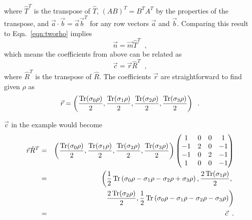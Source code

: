where $\hat{T}^T$ is the transpose of $\hat{T}$, $(AB)^T = B^TA^T$ by the properties of the transpose, and $\vec{a}\cdot\vec{b}=\vec{a}\vec{b}^T$ for any row vectors $\vec{a}$ and $\vec{b}$.  Comparing this result to Eqn.\ \ref{eqn:tworho} implies
$$
\vec{n} = \vec{m}\hat{T}^T\;\;,
$$
which means the coefficients from above can be related as
$$
\vec{c} = \vec{r}\hat{R}^T\;\;,
$$
where $\hat{R}^T$ is the transpose of $\hat{R}$.  The coefficients $\vec{r}$ are straightforward to find given $\rho$
as
$$
\vec{r} = \left(\frac{\operatorname{Tr}(\sigma_0 \rho)}{2},\frac{\operatorname{Tr}(\sigma_1 \rho)}{2},\frac{\operatorname{Tr}(\sigma_2 \rho)}{2},\frac{\operatorname{Tr}(\sigma_3 \rho)}{2}\right)\;\;.
$$
\begin{example}
$\vec{c}$ in the example would become
\begin{eqnarray*}
\vec{r}\hat{R}^T &=& \left(\frac{\operatorname{Tr}(\sigma_0 \rho)}{2},\frac{\operatorname{Tr}(\sigma_1 \rho)}{2},\frac{\operatorname{Tr}(\sigma_2 \rho)}{2},\frac{\operatorname{Tr}(\sigma_3 \rho)}{2}\right)\begin{pmatrix}
1 & 0 & 0 & 1\\
-1 & 2 & 0 & -1\\
-1 & 0 & 2 & -1\\
1 & 0 & 0 & -1
\end{pmatrix}\\
&=& \left(\frac{1}{2}\operatorname{Tr}\left(\sigma_0 \rho-\sigma_1 \rho-\sigma_2 \rho+\sigma_3 \rho\right),\frac{2\operatorname{Tr}(\sigma_1 \rho)}{2},\right. \\
& &\left.\frac{2\operatorname{Tr}(\sigma_2 \rho)}{2},\frac{1}{2}\operatorname{Tr}\left(\sigma_0 \rho-\sigma_1 \rho-\sigma_2 \rho-\sigma_3 \rho\right)\right)\\
&=&\vec{c}\;\;.
\end{eqnarray*}
\end{example}

